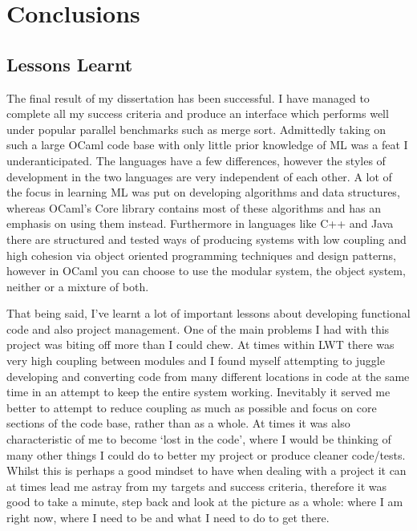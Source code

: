 \documentclass[12pt,twoside,notitlepage]{report}
\begin{document}
\chapter{Conclusions}
\label{chap:conclusions}
%
%

%
%
\section{Lessons Learnt}
The final result of my dissertation has been successful. I have managed to complete all my success criteria and produce an interface which performs well under popular parallel benchmarks such as merge sort. Admittedly taking on such a
large OCaml code base with only little prior knowledge of ML was a feat I underanticipated. The languages have a few differences, however the styles of development in the two languages are very independent of each other. A lot of the
focus in learning ML was put on developing algorithms and data structures, whereas OCaml's Core library contains most of these algorithms and has an emphasis on using them instead. Furthermore in languages like C++ and Java there are
structured and tested ways of producing systems with low coupling and high cohesion via object oriented programming techniques and design patterns, however in OCaml you can choose to use the modular system, the object system, neither
or a mixture of both\cite{chailloux2000}. 

That being said, I've learnt a lot of important lessons about developing functional code and also project management. One of the main problems I had with this project was biting off more than I could chew. At times within LWT there
was very high coupling between modules and I found myself attempting to juggle developing and converting code from many different locations in code at the same time in an attempt to keep the entire system working. Inevitably it served
me better to attempt to reduce coupling as much as possible and focus on core sections of the code base, rather than as a whole. At times it was also characteristic of me to become `lost in the code', where I would be thinking of many
other things I could do to better my project or produce cleaner code/tests. Whilst this is perhaps a good mindset to have when dealing with a project it can at times lead me astray from my targets and success criteria, therefore it
was good to take a minute, step back and look at the picture as a whole: where I am right now, where I need to be and what I need to do to get there.
\end{document}

